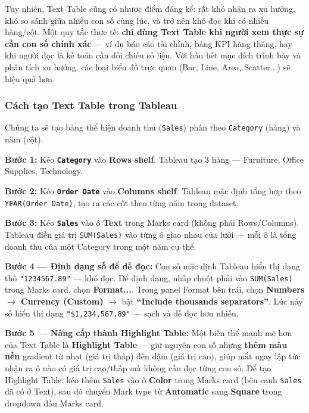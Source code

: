 \documentclass[12pt]{article}
\begin{document}
\noindent Tuy nhiên, Text Table cũng có nhược điểm đáng kể: rất khó nhận ra xu hướng, khó so sánh giữa nhiều con số cùng lúc, và trở nên khó đọc khi có nhiều hàng/cột. Một quy tắc thực tế: \textbf{chỉ dùng Text Table khi người xem thực sự cần con số chính xác} --- ví dụ báo cáo tài chính, bảng KPI hàng tháng, hay khi người đọc là kế toán cần đối chiếu số liệu. Với hầu hết mục đích trình bày và phân tích xu hướng, các loại biểu đồ trực quan (Bar, Line, Area, Scatter...) sẽ hiệu quả hơn.

\subsubsection{Cách tạo Text Table trong Tableau}

\noindent Chúng ta sẽ tạo bảng thể hiện doanh thu (\texttt{Sales}) phân theo \texttt{Category} (hàng) và năm (cột).

\noindent \textbf{Bước 1:} Kéo \textbf{\texttt{Category}} vào \textbf{Rows shelf}. Tableau tạo 3 hàng --- Furniture, Office Supplies, Technology.

\noindent \textbf{Bước 2:} Kéo \textbf{\texttt{Order Date}} vào \textbf{Columns shelf}. Tableau mặc định tổng hợp theo \texttt{YEAR(Order Date)}, tạo ra các cột theo từng năm trong dataset.

\noindent \textbf{Bước 3:} Kéo \textbf{\texttt{Sales}} vào ô \textbf{Text} trong Marks card (không phải Rows/Columns). Tableau điền giá trị \texttt{SUM(Sales)} vào từng ô giao nhau của lưới --- mỗi ô là tổng doanh thu của một Category trong một năm cụ thể.

\noindent \textbf{Bước 4 --- Định dạng số để dễ đọc:} Con số mặc định Tableau hiển thị dạng thô \texttt{"1234567.89"} --- khó đọc. Để định dạng, nhấp chuột phải vào \texttt{SUM(Sales)} trong Marks card, chọn \textbf{Format...}. Trong panel Format bên trái, chọn \textbf{Numbers $\rightarrow$ Currency (Custom)} $\rightarrow$ bật \textbf{``Include thousands separators''}. Lúc này số hiển thị dạng \texttt{"\$1,234,567.89"} --- sạch và dễ đọc hơn nhiều.

\noindent \textbf{Bước 5 --- Nâng cấp thành Highlight Table:} Một biến thể mạnh mẽ hơn của Text Table là \textbf{Highlight Table} --- giữ nguyên con số nhưng \textbf{thêm màu nền} gradient từ nhạt (giá trị thấp) đến đậm (giá trị cao), giúp mắt ngay lập tức nhận ra ô nào có giá trị cao/thấp mà không cần đọc từng con số. Để tạo Highlight Table: kéo thêm \texttt{Sales} vào ô \textbf{Color} trong Marks card (bên cạnh \texttt{Sales} đã có ở Text), sau đó chuyển Mark type từ \textbf{Automatic} sang \textbf{Square} trong dropdown đầu Marks card.
\end{document}
